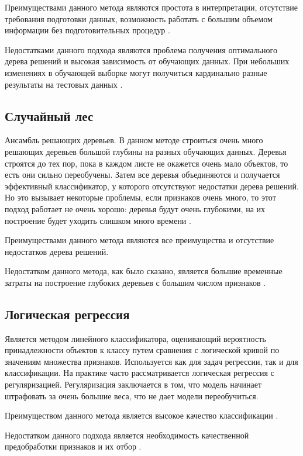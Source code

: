 \documentclass[a4paper,14pt, unknownkeysallowed]{extreport}
\begin{document}
	Преимуществами данного метода являются простота в интерпретации, отсутствие требования подготовки данных, возможность работать с большим объемом информации без подготовительных процедур \cite{Samigulin, Noskov}.
	
	Недостатками данного подхода являются проблема получения оптимального дерева решений и высокая зависимость от обучающих данных. При небольших изменениях в обучающей выборке могут получиться кардинально разные результаты на тестовых данных \cite{Samigulin}.
	
	\subsection{Случайный лес}
	
	Ансамбль решающих деревьев. В данном методе строиться очень много решающих деревьев большой глубины на разных обучающих данных. Деревья строятся до тех пор, пока в каждом листе не окажется очень мало объектов, то есть они сильно переобучены. Затем все деревья объединяются и получается эффективный классификатор, у которого отсутствуют недостатки дерева решений. Но это вызывает некоторые проблемы, если признаков очень много, то этот подход работает не очень хорошо: деревья будут очень глубокими, на их построение будет уходить слишком много времени \cite{Samigulin}.
	
	Преимуществами данного метода являются все преимущества и отсутствие недостатков дерева решений.
	
	Недостатком данного метода, как было сказано, является большие временные затраты на построение глубоких деревьев с большим числом признаков \cite{Noskov}.
	
	\subsection{Логическая регрессия}
	
	Является методом линейного классификатора, оценивающий вероятность принадлежности объектов к классу путем сравнения с логической кривой по значениям множества признаков. Используется как для задач регрессии, так и для классификации. На практике часто рассматривается логическая регрессия с регуляризацией. Регуляризация заключается в том, что модель начинает штрафовать за очень большие веса, что не дает модели переобучиться. 
	
	Преимуществом данного метода является высокое качество классификации \cite{Samigulin}. 
	
	Недостатком данного подхода является необходимость качественной предобработки признаков и их отбор \cite{Noskov}.
\end{document}
